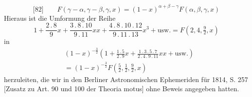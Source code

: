 \[
\text{[82]}\qquad F(\gamma-\alpha,\gamma-\beta,\gamma,x)=(1-x)^{\alpha+\beta-\gamma}F(\alpha,\beta,\gamma,x)
\]
Hieraus ist die Umformung der Reihe
\[
1+\frac{2\,.\,8}{9}x+\frac{3\,.\,8\,.\,10}{9\,.\,11}xx+\frac{4\,.\,8\,.\,10\,.\,12}{9\,.\,11\,.\,13}x^3+\text{usw.}=F(2,4,\tfrac{9}{2},x)
\]
in
\[
\begin{aligned}&(1-x)^{-\frac{3}{2}}\left(1+\frac{1\,.\,5}{2\,.\,9}x+\frac{1\,.\,3\,.\,5\,.\,7}{2\,.\,4\,.\,9\,.\,11}xx+\text{usw.}\right)\\&=(1-x)^{-\frac{3}{2}}F(\tfrac{5}{2},\tfrac{1}{2},\tfrac{9}{2},x)\end{aligned}
\]
herzuleiten, die wir in den Berliner Astronomischen Ephemeriden für 1814, S. 257 [Zusatz zu Art. 90 und 100 der Theoria motus] ohne Beweis angegeben hatten.


